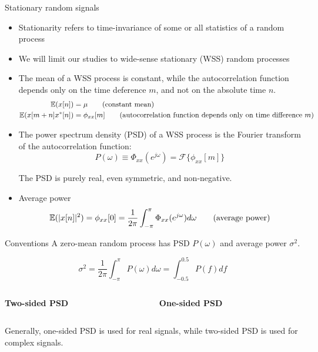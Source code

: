 \documentclass[10pt]{beamer}
\begin{document}
\begin{frame}{Stationary random signals}
	\begin{itemize}
		\item Stationarity refers to time-invariance of some or all statistics of a random process
		\item We will limit our studies to wide-sense stationary (WSS) random processes
		\item The mean of a WSS process is constant, while the autocorrelation function depends only on the time deference $m$, and not on the absolute time $n$.
		\begin{align}
			\operatorname{\mathbb{E}}(x[n]) &=\mu \tag{constant mean} \\
			\operatorname{\mathbb{E}}(x[m+n]x^*[n]) &= \phi_{xx}[m] \tag{autocorrelation function depends only on time difference $m$}
		\end{align}
		\item The power spectrum density (PSD) of a WSS process is the Fourier transform of the autocorrelation function:
		\begin{equation*}
			P(\omega) \equiv \Phi_{xx}(e^{j\omega}) = \mathcal{F}\{\phi_{xx}[m]\}
		\end{equation*}
		
		The PSD is purely real, even symmetric, and non-negative. 
		\item Average power
		\begin{equation}
			\operatorname{\mathbb{E}}(|x[n]|^2) = \phi_{xx}[0] = \frac{1}{2\pi}\int_{-\pi}^{\pi} \Phi_{xx}(e^{j\omega}) d\omega \tag{average power}
		\end{equation}
	\end{itemize}
\end{frame}

\begin{frame}{Conventions}
A zero-mean random process has PSD $P(\omega)$ and average power $\sigma^2$.

\begin{equation*}
	\sigma^2 = \frac{1}{2\pi} \int_{-\pi}^{\pi} P(\omega)d\omega = \int_{-0.5}^{0.5} P(f)df
\end{equation*}

\begin{columns}
	\begin{column}{0.5\textwidth}
		\textbf{Two-sided PSD}
	\end{column}

	\begin{column}{0.5\textwidth}
		\textbf{One-sided PSD}
	\end{column}
\end{columns}
\begin{center}
	\resizebox{\textwidth}{!}{}
\end{center}
Generally, one-sided PSD is used for real signals, while two-sided PSD is used for complex signals.
\end{frame}
\end{document}
